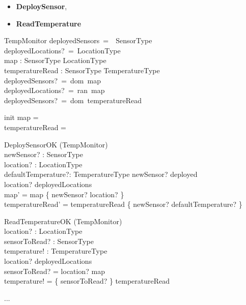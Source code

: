 \documentclass[12pt]{article}
\begin{document}
\begin{itemize}
	\item \textbf{DeploySensor},
	\item \textbf{ReadTemperature}
\end{itemize}

\newpage

\begin{class}{TempMonitor}
\also
deployedSensors~=~~SensorType\\
deployedLocations?~=~LocationType\\
map : SensorType \pfun LocationType\\
temperatureRead : SensorType \pfun TemperatureType\\
\where
deployedSensors?~=~dom~map\\
deployedLocations?~=~ran~map\\
deployedSensors?~=~dom~temperatureRead\\
\end{class}
\begin{class}{init}
map = \emptyset\\
temperatureRead = \emptyset
\end{class}
\begin{class}{DeploySensorOK}
\Delta (TempMonitor) \\
newSensor? : SensorType\\
location? : LocationType\\
defaultTemperature?: TemperatureType
\ST
newSensor? \notin deployed\\
location? \notin deployedLocations\\
map' = map \cup \{ newSensor? \mapsto location? \}\\
temperatureRead' = temperatureRead \cup \{ newSensor? \mapsto defaultTemperature? \}
\end{class}
\begin{class}{ReadTemperatureOK}
\Xi (TempMonitor) \\
location? : LocationType\\
sensorToRead? : SensorType\\
temperature! : TemperatureType\\
\ST
location? \in deployedLocations\\
sensorToRead? = {location?} \triangleleft map\\
temperature! = \{ sensorToRead? \} \triangleright  temperatureRead\\
\end{class}
...\\
\end{document}
